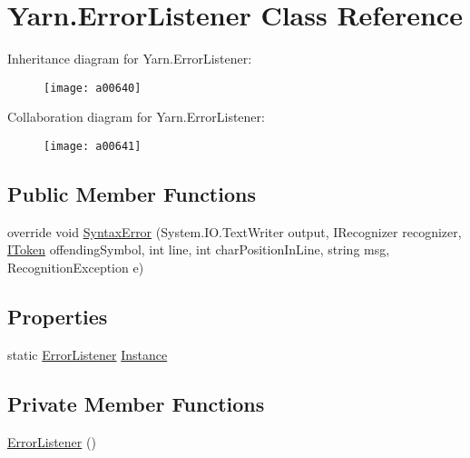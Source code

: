 \hypertarget{a00102}{\section{Yarn.\-Error\-Listener Class Reference}
\label{a00102}
}


Inheritance diagram for Yarn.\-Error\-Listener\-:
\nopagebreak
\begin{figure}[H]
\begin{center}
\leavevmode
\texttt{[image: a00640]}
\end{center}
\end{figure}


Collaboration diagram for Yarn.\-Error\-Listener\-:
\nopagebreak
\begin{figure}[H]
\begin{center}
\leavevmode
\texttt{[image: a00641]}
\end{center}
\end{figure}
\subsection*{Public Member Functions}
\begin{DoxyCompactItemize}
\item 
override void \hyperlink{a00102_a47fb9f6d50aa6a4e4796dea10b237fe4}{Syntax\-Error} (System.\-I\-O.\-Text\-Writer output, I\-Recognizer recognizer, \hyperlink{a00322_ae3d87b0b748ea892bff48f60862e182d}{I\-Token} offending\-Symbol, int line, int char\-Position\-In\-Line, string msg, Recognition\-Exception e)
\end{DoxyCompactItemize}
\subsection*{Properties}
\begin{DoxyCompactItemize}
\item 
static \hyperlink{a00102}{Error\-Listener} \hyperlink{a00102_a47b8f4f1d414afa1ea6067218c7ee34d}{Instance}
\end{DoxyCompactItemize}
\subsection*{Private Member Functions}
\begin{DoxyCompactItemize}
\item 
\hyperlink{a00102_a1f0cc41aac10bd8a2402355534c1123c}{Error\-Listener} ()
\end{DoxyCompactItemize}
